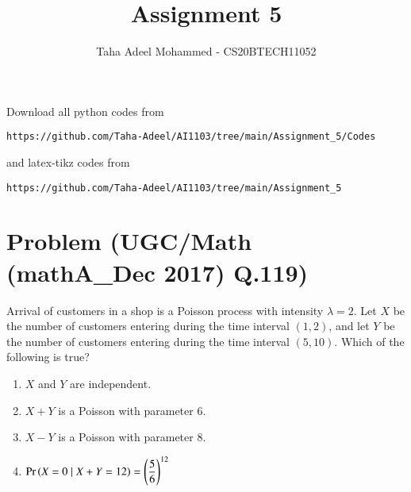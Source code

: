 \documentclass[journal,12pt,twocolumn]{IEEEtran}
\begin{document}
     \def\rightbox#1{\makebox[0in][r]{#1}}
     \def\centbox#1{\makebox[0in]{#1}}
     \def\topbox#1{\raisebox{-\baselineskip}[0in][0in]{#1}}
     \def\midbox#1{\raisebox{-0.5\baselineskip}[0in][0in]{#1}}
\vspace{3cm}
\title{Assignment 5}
\author{Taha Adeel Mohammed - CS20BTECH11052}
\maketitle
\newpage
\bigskip
\renewcommand{\thefigure}{\theenumi}
\renewcommand{\thetable}{\theenumi}
Download all python codes from 
\begin{lstlisting}
https://github.com/Taha-Adeel/AI1103/tree/main/Assignment_5/Codes
\end{lstlisting}
%
and latex-tikz codes from 
%
\begin{lstlisting}
https://github.com/Taha-Adeel/AI1103/tree/main/Assignment_5
\end{lstlisting}
\section{Problem (UGC/Math (mathA\_Dec 2017) Q.119)}
Arrival of customers in a shop is a Poisson process with intensity $\lambda =2$. Let $X$ be the number of customers entering during the time interval $(1,2)$, and let $Y$ be the number of customers entering during the time interval $(5,10)$. Which of the following is true?
\begin{enumerate}[label=(\Alph*)]
    \item$X$ and $Y$ are independent.\\
    \item$X+Y$ is a Poisson with parameter $6$. \\
    \item$X-Y$ is a Poisson with parameter $8$.\\
    \item$\Pr\left(X=0\mid X+Y=12\right)=\left(\dfrac{5}{6}\right)^{12}$
\end{enumerate}
\end{document}
